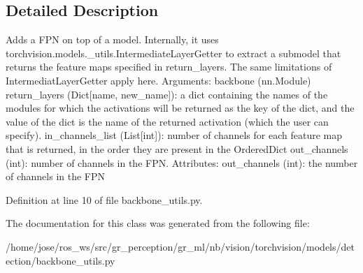 \subsection{Detailed Description}
\begin{DoxyVerb}Adds a FPN on top of a model.
Internally, it uses torchvision.models._utils.IntermediateLayerGetter to
extract a submodel that returns the feature maps specified in return_layers.
The same limitations of IntermediatLayerGetter apply here.
Arguments:
    backbone (nn.Module)
    return_layers (Dict[name, new_name]): a dict containing the names
        of the modules for which the activations will be returned as
        the key of the dict, and the value of the dict is the name
        of the returned activation (which the user can specify).
    in_channels_list (List[int]): number of channels for each feature map
        that is returned, in the order they are present in the OrderedDict
    out_channels (int): number of channels in the FPN.
Attributes:
    out_channels (int): the number of channels in the FPN
\end{DoxyVerb}
 

Definition at line 10 of file backbone\+\_\+utils.\+py.



The documentation for this class was generated from the following file\+:\begin{DoxyCompactItemize}
\item 
/home/jose/ros\+\_\+ws/src/gr\+\_\+perception/gr\+\_\+ml/nb/vision/torchvision/models/detection/backbone\+\_\+utils.\+py\end{DoxyCompactItemize}
